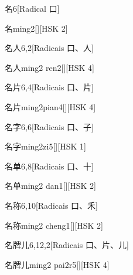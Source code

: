\begin{entry}{名}{6}[Radical ⼝]
  \begin{phonetics}{名}{ming2}[][HSK 2]
  \end{phonetics}
\end{entry}

\begin{entry}{名人}{6,2}[Radicais ⼝、⼈]
  \begin{phonetics}{名人}{ming2 ren2}[][HSK 4]
  \end{phonetics}
\end{entry}

\begin{entry}{名片}{6,4}[Radicais ⼝、⽚]
  \begin{phonetics}{名片}{ming2pian4}[][HSK 4]
  \end{phonetics}
\end{entry}

\begin{entry}{名字}{6,6}[Radicais ⼝、⼦]
  \begin{phonetics}{名字}{ming2zi5}[][HSK 1]
  \end{phonetics}
\end{entry}

\begin{entry}{名单}{6,8}[Radicais ⼝、⼗]
  \begin{phonetics}{名单}{ming2 dan1}[][HSK 2]
  \end{phonetics}
\end{entry}

\begin{entry}{名称}{6,10}[Radicais ⼝、⽲]
  \begin{phonetics}{名称}{ming2 cheng1}[][HSK 2]
  \end{phonetics}
\end{entry}

\begin{entry}{名牌儿}{6,12,2}[Radicais ⼝、⽚、⼉]
  \begin{phonetics}{名牌儿}{ming2 pai2r5}[][HSK 4]
  \end{phonetics}
\end{entry}

